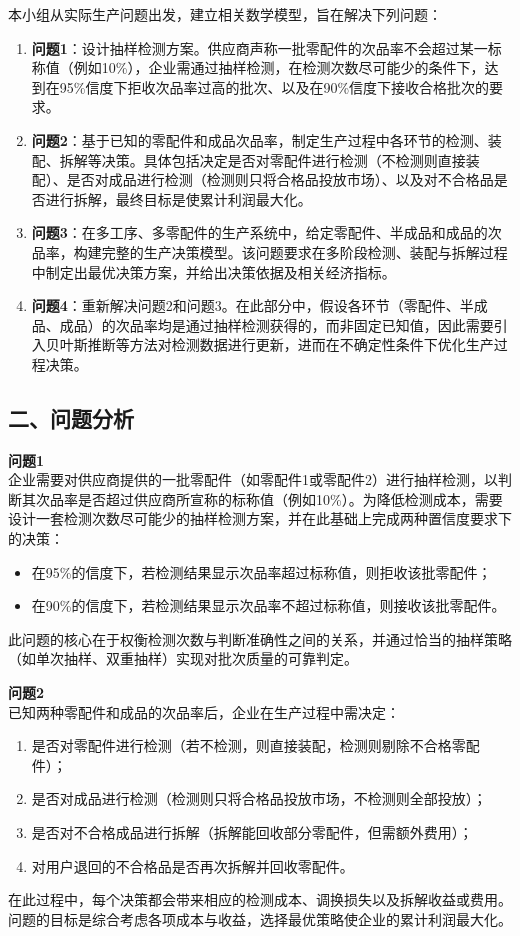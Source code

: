 \documentclass{article}
\begin{document}
	本小组从实际生产问题出发，建立相关数学模型，旨在解决下列问题：
	\begin{enumerate}
		\item \textbf{问题1}：设计抽样检测方案。供应商声称一批零配件的次品率不会超过某一标称值（例如10\%），企业需通过抽样检测，在检测次数尽可能少的条件下，达到在95\%信度下拒收次品率过高的批次、以及在90\%信度下接收合格批次的要求。
		\item \textbf{问题2}：基于已知的零配件和成品次品率，制定生产过程中各环节的检测、装配、拆解等决策。具体包括决定是否对零配件进行检测（不检测则直接装配）、是否对成品进行检测（检测则只将合格品投放市场）、以及对不合格品是否进行拆解，最终目标是使累计利润最大化。
		\item \textbf{问题3}：在多工序、多零配件的生产系统中，给定零配件、半成品和成品的次品率，构建完整的生产决策模型。该问题要求在多阶段检测、装配与拆解过程中制定出最优决策方案，并给出决策依据及相关经济指标。
		\item \textbf{问题4}：重新解决问题2和问题3。在此部分中，假设各环节（零配件、半成品、成品）的次品率均是通过抽样检测获得的，而非固定已知值，因此需要引入贝叶斯推断等方法对检测数据进行更新，进而在不确定性条件下优化生产过程决策。
	\end{enumerate}
	\begin{center}	
		\section*{二、问题分析}
	\end{center}
	\noindent
	\textbf{问题1}\\
	企业需要对供应商提供的一批零配件（如零配件1或零配件2）进行抽样检测，以判断其次品率是否超过供应商所宣称的标称值（例如10\%）。为降低检测成本，需要设计一套检测次数尽可能少的抽样检测方案，并在此基础上完成两种置信度要求下的决策：
	\begin{itemize}
		\item 在95\%的信度下，若检测结果显示次品率超过标称值，则拒收该批零配件；
		\item 在90\%的信度下，若检测结果显示次品率不超过标称值，则接收该批零配件。
	\end{itemize}
	此问题的核心在于权衡检测次数与判断准确性之间的关系，并通过恰当的抽样策略（如单次抽样、双重抽样）实现对批次质量的可靠判定。
	
	\vspace{1em}
	\noindent
	\textbf{问题2}\\
	已知两种零配件和成品的次品率后，企业在生产过程中需决定：
	\begin{enumerate}
		\item 是否对零配件进行检测（若不检测，则直接装配，检测则剔除不合格零配件）；
		\item 是否对成品进行检测（检测则只将合格品投放市场，不检测则全部投放）；
		\item 是否对不合格成品进行拆解（拆解能回收部分零配件，但需额外费用）；
		\item 对用户退回的不合格品是否再次拆解并回收零配件。
	\end{enumerate}
	在此过程中，每个决策都会带来相应的检测成本、调换损失以及拆解收益或费用。问题的目标是综合考虑各项成本与收益，选择最优策略使企业的累计利润最大化。
	
\end{document}
